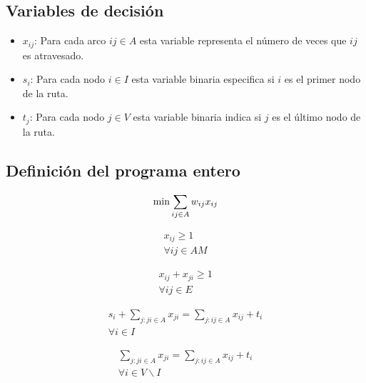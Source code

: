 \subsection{Variables de decisión}
\begin{itemize}
\item $x_{i j}$: Para cada arco $ {i j} \in A$ esta variable representa el número de veces que $i j$ es atravesado.

\item $s_i$: Para cada nodo $i \in I$ esta variable binaria especifica si  $i$ es el primer nodo de la ruta.

\item $t_j$: Para cada nodo $j \in V$ esta variable binaria indica si $j$ es el último nodo de la ruta.
\end{itemize}

\subsection{Definición del programa entero}
\label{sec:programa-entero}
\begin{equation*}
\min \sum_{i j \in A} w_{i j} x_{i j}  \\
\end{equation*} 
\hbox{}

\begin{equation} \tag{1} \label{eq1}
\begin{gathered}
x_{i j} \geq 1 \\
\forall i j \in A M
\end{gathered}
\end{equation} 
\hbox{}

\begin{equation} \tag{2} \label{eq2}
\begin{gathered}
x_{i j} + x_{j i} \geq 1 \\
\forall i j \in E
\end{gathered}
\end{equation}
\hbox{}

\begin{equation} \tag{3a} \label{eq3a}
\begin{gathered}
s_i + \sum_{j: j i \in A} x_{j i} = \sum_{j: i j \in A} x_{i j} + t_i \\
\forall i \in I
\end{gathered}
\end{equation} 
\hbox{}

\begin{equation} \tag{3b} \label{eq3b}
\begin{gathered}
\sum_{j: j i \in A} x_{j i} = \sum_{j: i j \in A} x_{i j} + t_i \\
\forall i \in V\backslash I
\end{gathered}
\end{equation}
\hbox{}

